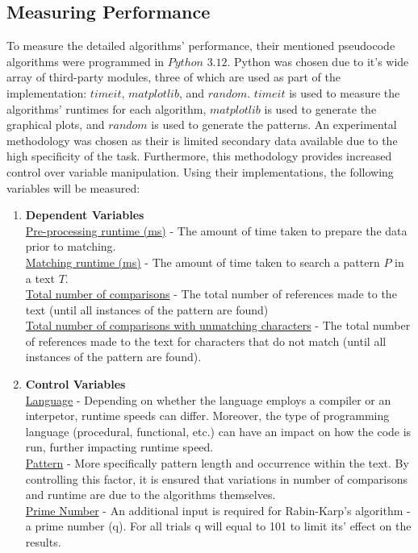 \documentclass[12pt]{article}
\begin{document}
\subsection{Measuring Performance}

To measure the detailed algorithms' performance, their mentioned pseudocode algorithms were programmed in $Python$ $3.12$. 
Python was chosen due to it's wide array of third-party modules, three of which are used as part of the implementation: $timeit$, $matplotlib$, and $random$. 
$timeit$ is used to measure the algorithms' runtimes for each algorithm, $matplotlib$ is used to generate the graphical plots, and $random$ is used to generate the patterns.
An experimental methodology was chosen as their is limited secondary data available due to the high specificity of the task. Furthermore, this methodology provides increased control over variable manipulation.
Using their implementations, the following variables will be measured:

\begin{enumerate}
	\item \textbf{Dependent Variables} \\
	\underline{Pre-processing runtime (ms)} - The amount of time taken to prepare the data prior to matching.\\
	\underline{Matching runtime (ms)} - The amount of time taken to search a pattern $P$ in a text $T$.\\
	\underline{Total number of comparisons} - The total number of references made to the text (until all instances of the pattern are found) \\
	\underline{Total number of comparisons with unmatching characters} - The total number of references made to the text for characters that do not match (until all instances of the pattern are found).
	\item \textbf{Control Variables} \\
	\underline{Language} - Depending on whether the language employs a compiler or an interpetor, runtime speeds can differ. Moreover, the type of programming language (procedural, functional, etc.) can have an impact on how the code is run, further impacting runtime speed.\\
	\underline{Pattern} - More specifically pattern length and occurrence within the text. By controlling this factor, it is ensured that variations in number of comparisons and runtime are due to the algorithms themselves. \\
	\underline{Prime Number} - An additional input is required for Rabin-Karp's algorithm - a prime number (q). For all trials q will equal to 101 to limit its' effect on the results.
\end{enumerate}
\end{document}
